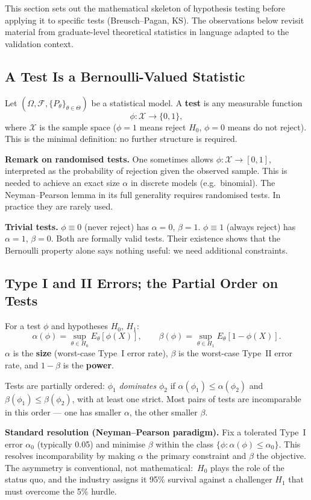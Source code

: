 \documentclass[11pt, a4paper]{article}
\begin{document}
This section sets out the mathematical skeleton of hypothesis testing before applying
it to specific tests (Breusch--Pagan, KS).  The observations below revisit material from
graduate-level theoretical statistics in language adapted to the validation context.

\subsection{A Test Is a Bernoulli-Valued Statistic}

Let $(\Omega, \mathcal{F}, \{P_\theta\}_{\theta\in\Theta})$ be a statistical model.
A \textbf{test} is any measurable function
\[
  \phi: \mathcal{X} \to \{0, 1\},
\]
where $\mathcal{X}$ is the sample space ($\phi=1$ means reject $H_0$, $\phi=0$ means
do not reject). This is the minimal definition: no further structure is required.

\textbf{Remark on randomised tests.}
One sometimes allows $\phi:\mathcal{X}\to[0,1]$, interpreted as the probability of
rejection given the observed sample. This is needed to achieve an exact size $\alpha$
in discrete models (e.g.\ binomial). The Neyman--Pearson lemma in its full generality
requires randomised tests. In practice they are rarely used.

\textbf{Trivial tests.}
$\phi\equiv 0$ (never reject) has $\alpha=0$, $\beta=1$.
$\phi\equiv 1$ (always reject) has $\alpha=1$, $\beta=0$.
Both are formally valid tests. Their existence shows that the Bernoulli property alone
says nothing useful: we need additional constraints.

\subsection{Type I and II Errors; the Partial Order on Tests}

For a test $\phi$ and hypotheses $H_0$, $H_1$:
\[
  \alpha(\phi) = \sup_{\theta\in H_0} E_\theta[\phi(X)], \qquad
  \beta(\phi)  = \sup_{\theta\in H_1} E_\theta[1-\phi(X)].
\]
$\alpha$ is the \textbf{size} (worst-case Type~I error rate),
$\beta$ is the worst-case Type~II error rate, and $1-\beta$ is the \textbf{power}.

Tests are partially ordered: $\phi_1$ \emph{dominates} $\phi_2$ if
$\alpha(\phi_1)\leq\alpha(\phi_2)$ and $\beta(\phi_1)\leq\beta(\phi_2)$, with at least
one strict. Most pairs of tests are incomparable in this order --- one has smaller
$\alpha$, the other smaller $\beta$.

\textbf{Standard resolution (Neyman--Pearson paradigm).}
Fix a tolerated Type~I error $\alpha_0$ (typically 0.05) and minimise $\beta$ within
the class $\{\phi: \alpha(\phi)\leq\alpha_0\}$.
This resolves incomparability by making $\alpha$ the primary constraint and $\beta$
the objective. The asymmetry is conventional, not mathematical:\ $H_0$ plays the role
of the status quo, and the industry assigns it 95\% survival against a challenger $H_1$
that must overcome the 5\% hurdle.
\end{document}
